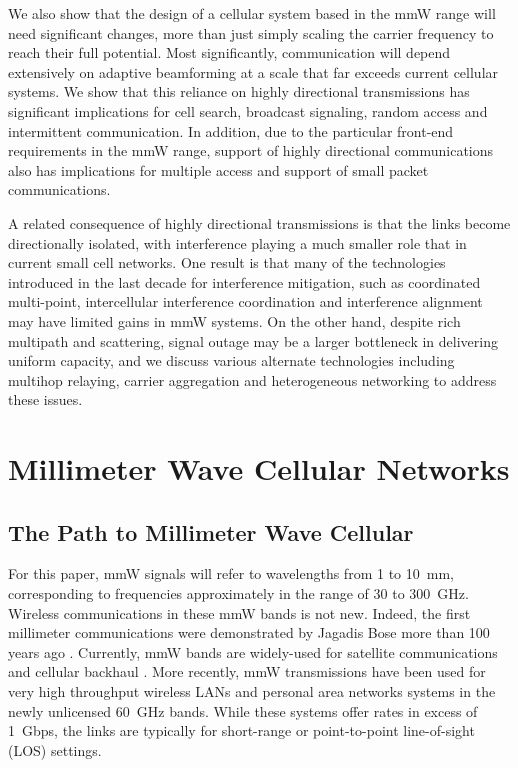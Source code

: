 \documentclass[journal]{IEEEtran}
\begin{document}
We also show that
the design of a cellular system based in the mmW range
will need significant changes, more than just simply scaling the carrier frequency
to reach their full potential.
Most significantly, communication will depend extensively on adaptive
beamforming at a scale that far exceeds current cellular systems.
We show that this reliance on highly directional transmissions
has significant implications for
cell search, broadcast signaling, random access and
intermittent communication.  In addition, due to the particular front-end
requirements in the mmW range, support of highly directional
communications also has implications for multiple access and support of small
packet communications.

A related consequence of highly directional transmissions is that
the links become directionally isolated, with interference playing a
much smaller role that in current small cell networks.  One result is that
many of the technologies introduced in the last decade for interference mitigation,
such as coordinated multi-point, intercellular interference
coordination and interference alignment may have limited gains in
mmW systems.
On the other hand, despite rich multipath and scattering,
signal outage may be a larger bottleneck in delivering
uniform capacity, and we discuss various alternate technologies including
multihop relaying, carrier aggregation and heterogeneous networking
to address these issues.


\section{Millimeter Wave Cellular Networks}
    \label{sec:background}

\subsection{The Path to Millimeter Wave Cellular} \label{sec:prior}

For this paper, mmW signals will refer to
wavelengths from 1 to 10~mm, corresponding to
frequencies approximately in the range of 30 to 300~GHz.
Wireless communications in these mmW bands is not new.
Indeed, the first millimeter communications were demonstrated by Jagadis Bose
more than 100 years ago \cite{Bose:27}.
Currently, mmW bands are widely-used for satellite communications
\cite{Roddy:06} and cellular backhaul
\cite{EricssonBackhaul:13,NGNM-Backhaul:12-short,ECC-Backhaul:12}.
More recently, mmW transmissions have been used for
very high throughput wireless LANs and personal area networks systems
 \cite{Ted:60Gstate11,PerCPY:10,VauNic:10,Daniels:10,Baykas-WPAN:11}
in the newly unlicensed 60~GHz bands.
While these systems offer rates in excess of 1~Gbps, the links
are typically for short-range or point-to-point line-of-sight (LOS) settings.
\end{document}
